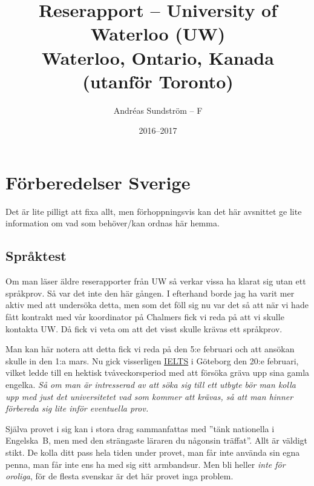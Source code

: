\documentclass[11pt,a4paper, english, swedish]{article}
\begin{document}
\title{Reserapport -- University of Waterloo (UW) 
\\ \Large Waterloo, Ontario, Kanada \large(utanför Toronto)}
\author{Andréas Sundström -- F}
\date{2016--2017}

\maketitle

\addtocounter{section}{-1}
\section{Förberedelser Sverige}
Det är lite pilligt att fixa allt, men förhoppningsvis kan det här
avsnittet ge lite information om vad som behöver/kan ordnas här hemma.

\subsection{Språktest}
Om man läser äldre reserapporter från UW så verkar vissa ha klarat sig
utan ett språkprov. Så var det inte den här gången. I efterhand borde
jag ha varit mer aktiv med att undersöka detta, men som det föll sig
nu var det så att när vi hade fått kontrakt med vår koordinator på
Chalmers fick vi reda på att vi skulle kontakta UW\footnotemark{}.
Då fick vi veta om att det visst skulle krävas ett språkprov. 

Man kan här notera att detta fick vi reda på den 5:e februari och att
ansökan skulle in den 1:a mars. Nu gick visserligen
\href{http://www.folkuniversitetet.se/Las-mer-om-sprak/Sprakexamina/IELTS/IELTS-Goteborg/}{IELTS}
i Göteborg den 20:e februari, vilket ledde till en hektisk
tvåveckorsperiod med att försöka gräva upp sina gamla
engelka. \emph{Så om man är intresserad av att söka sig till ett
  utbyte bör man kolla upp med just det universitetet vad som kommer
  att krävas, så att man hinner förbereda sig lite inför eventuella
  prov.}

Själva provet i sig kan i stora drag sammanfattas med ''tänk
nationella i Engelska~B, men med den strängaste läraren du någonsin
träffat''. Allt är väldigt stikt. De kolla ditt pass hela tiden
under provet, man får inte använda sin egna penna, man får inte ens ha
med sig sitt armbandsur. Men bli heller \emph{inte för oroliga}, för
de flesta svenskar är det här provet inga problem. 
\end{document}
